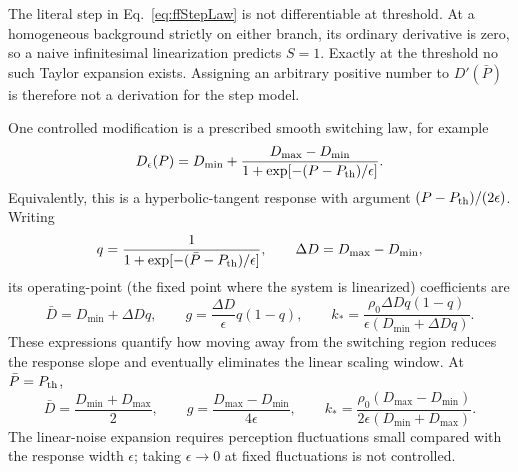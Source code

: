 \documentclass{article}
\begin{document}
The literal step in Eq.~\eqref{eq:ffStepLaw} is not differentiable at threshold. At a homogeneous background strictly on either branch, its ordinary derivative is zero, so a naive infinitesimal linearization predicts $S=1$. Exactly at the threshold no such Taylor expansion exists. Assigning an arbitrary positive number to $D'(\bar P)$ is therefore not a derivation for the step model.

One controlled modification is a prescribed smooth switching law, for example
\begin{equation}
    D_\epsilon(P)=D_{\min}+
    \frac{D_{\max}-D_{\min}}{1+\exp[-(P-P_{\rm th})/\epsilon]}.
\end{equation}
Equivalently, this is a hyperbolic-tangent response with argument $(P-P_{\rm th})/(2\epsilon)$. Writing
\begin{equation}
    q=\frac{1}{1+\exp[-(\bar P-P_{\rm th})/\epsilon]},\qquad
    \Delta D=D_{\max}-D_{\min},
\end{equation}
its operating-point (the fixed point where the system is linearized) coefficients are
\begin{equation}
    \bar D=D_{\min}+\Delta D q,\qquad
    g=\frac{\Delta D}{\epsilon}q(1-q),\qquad
    k_* =\frac{\rho_0\Delta D q(1-q)}{\epsilon(D_{\min}+\Delta Dq)}.
    \label{eq:ffLogisticGeneral}
\end{equation}
These expressions quantify how moving away from the switching region reduces the response slope and eventually eliminates the linear scaling window.
At $\bar P=P_{\rm th}$,
\begin{equation}
    \bar D=\frac{D_{\min}+D_{\max}}2,\qquad
    g=\frac{D_{\max}-D_{\min}}{4\epsilon},\qquad
    k_* =\frac{\rho_0(D_{\max}-D_{\min})}
    {2\epsilon(D_{\min}+D_{\max})}.
\end{equation}
The linear-noise expansion requires perception fluctuations small compared with the response width $\epsilon$; taking $\epsilon\to0$ at fixed fluctuations is not controlled.
\end{document}
